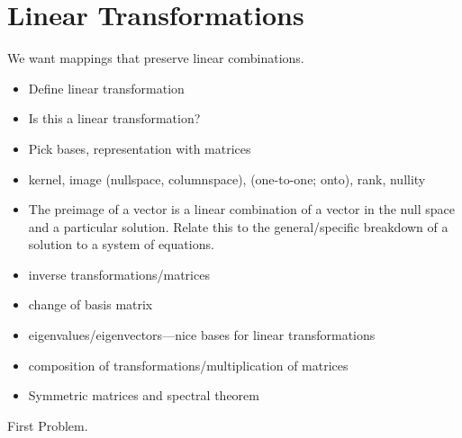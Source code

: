 \chapter{Linear Transformations}

We want mappings that preserve linear combinations.

\begin{itemize}
\item Define linear transformation
\item Is this a linear transformation?
\item Pick bases, representation with matrices
\item kernel, image (nullspace, columnspace), (one-to-one; onto),
  rank, nullity
\item The preimage of a vector is a linear combination of a vector in
  the null space and a particular solution.  Relate this to the
  general/specific breakdown of a solution to a system of equations.
\item inverse transformations/matrices
\item change of basis matrix
\item eigenvalues/eigenvectors---nice bases for linear transformations
\item composition of transformations/multiplication of matrices
\item Symmetric matrices and spectral theorem
\end{itemize}

\begin{problem}
  First Problem.
\end{problem}


